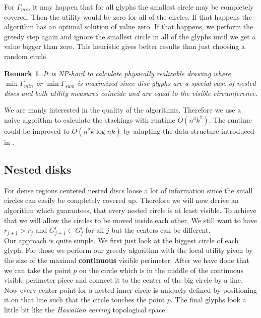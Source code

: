\documentclass[a4paper,11pt]{article}
\newtheorem*{remark}{Remark}
\begin{document}
For $\Gamma_{min}$ it may happen that for all glyphs the smallest circle may be completely covered. Then the utility would be zero for all of the circles. If that happens the algorithm has an optimal solution of value zero. If that happens, we perform the greedy step again and ignore the smallest circle in all of the glyphs until we get a value bigger than zero. This heuristic gives better results than just choosing a random circle.\\
%
\begin{remark}
It is NP-hard to calculate physically realizable drawing where $\min\Gamma_{min}$ or $\min\Gamma_{sum}$ is maximized since disc glyphs are a special case of nested discs and both utility measures coincide and are equal to the visible circumference.
\end{remark}
We are manly interested in the quality of the algorithms. Therefore we use a naive algorithm to calculate the stackings with runtime $O(n^3k^2)$. The runtime could be improved to $O(n^2k \log nk)$ by adapting the data structure introduced in \cite{caballo}.


\subsection{Nested disks}

For dense regions centered nested discs loose a lot of information since the small circles can easily be completely covered up. Therefore we will now derive an algorithm which guarantees, that every nested circle is at least visible. To achieve that we will allow the circles to be moved inside each other. We still want to have $r_{j+1}>r_j$ and $G^i_{j+1}\subset G^i_j$ for all $j$ but the centers can be different.\\

Our approach is quite simple. We first just look at the biggest circle of each glyph. For those we perform our greedy algorithm with the local utility given by the size of the maximal \textbf{continuous} visible perimeter. After we have done that we can take the point $p$ on the circle which is in the middle of the continuous visible perimeter piece and connect it to the center of the big circle by a line. Now every center point for a nested inner circle is uniquely defined by positioning it on that line such that the circle touches the point $p$. The final glyphs look a little bit like the \textit{Hawaiian earring} topological space.\\
\end{document}
